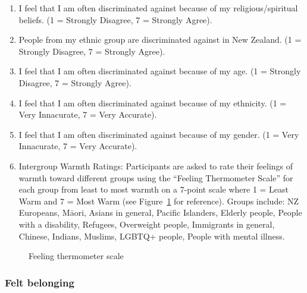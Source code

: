 \documentclass[
]{interact}
\providecommand{\tightlist}{%
  \setlength{\itemsep}{0pt}\setlength{\parskip}{0pt}}\usepackage{longtable,booktabs,array}
\begin{document}
\begin{enumerate}
\def\labelenumi{\arabic{enumi}.}
\tightlist
\item
  I feel that I am often discriminated against because of my
  religious/spiritual beliefs. (1 = Strongly Disagree, 7 = Strongly
  Agree).
\item
  People from my ethnic group are discriminated against in New Zealand.
  (1 = Strongly Disagree, 7 = Strongly Agree).
\item
  I feel that I am often discriminated against because of my age. (1 =
  Strongly Disagree, 7 = Strongly Agree).
\item
  I feel that I am often discriminated against because of my ethnicity.
  (1 = Very Innacurate, 7 = Very Accurate).
\item
  I feel that I am often discriminated against because of my gender. (1
  = Very Innacurate, 7 = Very Accurate).
\item
  Intergroup Warmth Ratings: Participants are asked to rate their
  feelings of warmth toward different groups using the ``Feeling
  Thermometer Scale'' for each group from least to most warmth on a
  7-point scale where 1 = Least Warm and 7 = Most Warm (see
  Figure~\ref{fig-warmth} for reference). Groups include: NZ Europeans,
  Māori, Asians in general, Pacific Islanders, Elderly people, People
  with a disability, Refugees, Overweight people, Immigrants in general,
  Chinese, Indians, Muslims, LGBTQ+ people, People with mental illness.
\end{enumerate}

\begin{figure}


\caption{\label{fig-warmth}Feeling thermometer scale}

\end{figure}%

\subsubsection{Felt belonging}\label{felt-belonging}
\end{document}
